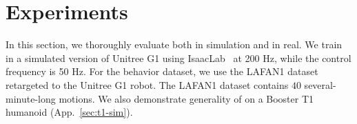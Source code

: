 \section{Experiments}\label{sec:experiments}
\vspace{-2mm}

In this section, we thoroughly evaluate \method{} both in simulation and in real.
%
%
We train \method{} in a simulated version of Unitree G1 using IsaacLab~\citep{MittalYYLRHYSGMMBSHG23} at 200 Hz, while the control frequency is 50 Hz. For the behavior dataset, we use the LAFAN1 dataset~\citep{HarveyYNP20lafan1} retargeted to the Unitree G1 robot. The LAFAN1 dataset contains $40$ several-minute-long motions. 
We also demonstrate generality of \method{} on a Booster T1 humanoid (App.~\ref{sec:t1-sim}).




